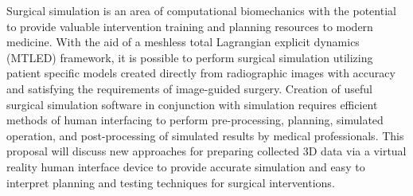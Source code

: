 \begin{comment}
Background Information
Creates a clear picture of the field

Problem Statement
The problem is stated clearly and specifically
Intended Contribution
The intended contribution is stated clearly and specifically

Extent of Review
The review is extensive and focused

Structure of Review
The structure is logical and leads to the identified problem and proposed method of research

Appropriate Sources
The sources are scholarly and or professional

Explanation of Method
It is clear how the research will be carried out

Identification of Resources
All necessary resources have been identified and their requirement justified 

Timeline to Completion
The timeline is realistic and detailed

Quality of Writing 
The writing is excellent

Citations
All sources have been cited

Appropriate Length 
The length is appropriate (body of document 2000-3000 words)
\end{comment}

Surgical simulation is an area of computational biomechanics with the potential to provide valuable intervention training and planning resources to modern medicine. With the aid of a meshless total Lagrangian explicit dynamics (MTLED) framework, it is possible to perform surgical simulation utilizing patient specific models created directly from radiographic images with accuracy and satisfying the requirements of image-guided surgery. Creation of useful surgical simulation software in conjunction with simulation requires efficient methods of human interfacing to perform pre-processing, planning, simulated operation, and post-processing of simulated results by medical professionals. This proposal will discuss new approaches for preparing collected 3D data via a virtual reality human interface device to provide accurate simulation and easy to interpret planning and testing techniques for surgical interventions.